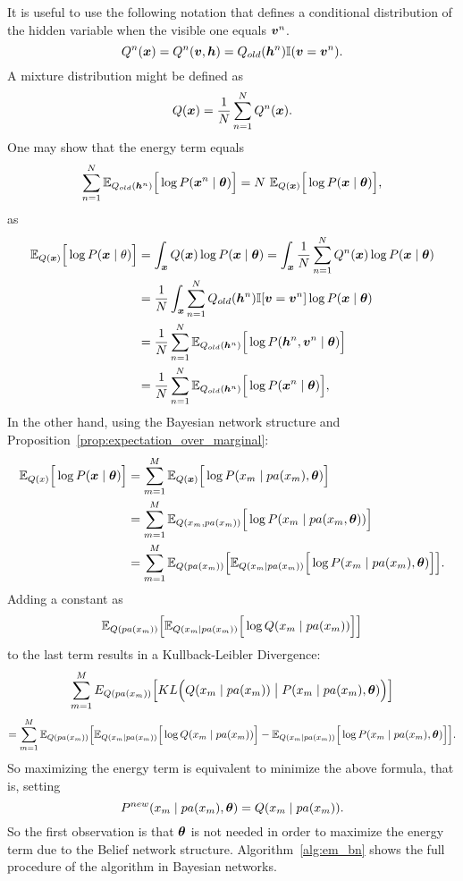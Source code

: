 It is useful to use the following notation that defines a conditional distribution of the hidden variable when the visible one equals \(\bm{v}^{n}\).
\[
  Q^{n}(\bm{x}) = Q^{n}(\bm{v},\bm{h}) = Q_{old}(\bm{h}^{n}) \mathbb{I}(\bm{v} = \bm{v}^{n}).
\]
A mixture distribution might be defined as
\[
  Q(\bm{x}) = \frac{1}{N}\sum_{n = 1}^{N}Q^{n}(\bm{x}).
\]
One may show that the energy term equals
\[
  \sum_{n = 1}^{N}\E{Q_{old}(\bh^n)}{\log{P(\bx^{n} \mid \btheta)}} = N \ \E{Q(\bx)}{\log{P(\bx \mid \btheta)}},
\]
as
\[
  \begin{aligned}
    \mathbb{E}_{Q(\bm{x})}\Big[\log{P(\bm{x}\mid \theta)}\Big] &= \int_{\bm{x}}Q(\bm{x})\log{P(\bm{x}\mid \bm{\theta})} =  \int_{\bm{x}} \frac{1}{N}\sum_{n=1}^{N}Q^{n}(\bm{x})\log{P(\bm{x}\mid \bm{\theta})} \\
    &= \frac{1}{N} \int_{\bm{x}}\sum_{n=1}^{N}Q_{old}(\bm{h}^n)\mathbb{I}[\bm{v} = \bm{v}^{n}]\log{P(\bm{x}\mid \bm{\theta})}\\
    &= \frac{1}{N}\sum_{n = 1}^{N}\mathbb{E}_{Q_{old}(\bm{h}^n)}\Big[\log{P(\bm{h}^n, \bm{v}^{n} \mid \bm{\theta})}\Big]\\
    &= \frac{1}{N}\sum_{n = 1}^{N}\mathbb{E}_{Q_{old}(\bm{h}^n)}\Big[\log{P(\bm{x}^{n} \mid \bm{\theta})}\Big],
  \end{aligned}
\]
In the other hand, using the Bayesian network structure and Proposition~\ref{prop:expectation_over_marginal}:
\[
  \begin{aligned}
    \mathbb{E}_{Q(x)}\Big[\log{P(\bm{x}\mid \bm{\theta})}\Big] &= \sum_{m = 1}^{M}\mathbb{E}_{Q(\bm{x})}\Big[\log{P(x_{m} \mid pa(x_{m}), \bm{\theta})}\Big]\\
    &= \sum_{m = 1}^{M}\mathbb{E}_{Q(x_{m}, pa(x_{m}))}\Big[\log{P(x_{m} \mid pa(x_{m}, \bm{\theta}))}\Big]\\
    &= \sum_{m = 1}^{M}\mathbb{E}_{Q(pa(x_{m}))}\Big[ \mathbb{E}_{Q(x_{m}\mid pa(x_{m}))}\Big[ \log{P(x_{m} \mid pa(x_{m}), \bm{\theta})}\Big]\Big].
\end{aligned}
\]
Adding a constant as
\[
  \mathbb{E}_{Q(pa(x_{m}))}\Big[\mathbb{E}_{Q(x_{m}\mid pa(x_{m}))}\Big[\log{Q(x_{m} \mid pa(x_{m}))}\Big]\Big]
\]
to the last term results in a Kullback-Leibler Divergence:
\[
  \sum_{m = 1}^{M} E_{Q(pa(x_{m}))} \Big[ KL\Big(Q(x_{m}\mid pa(x_{m})) \bigm| P(x_{m} \mid pa(x_{m}), \bm{\theta})\Big)\Big]
\]
\[
  =\sum_{m = 1}^{M}\mathbb{E}_{Q(pa(x_{m}))}\Big[\mathbb{E}_{Q(x_{m}\mid pa(x_{m}))}\Big[\log{Q(x_{m} \mid pa(x_{m}))}\Big] - \mathbb{E}_{Q(x_{m}\mid pa(x_{m}))}\Big[\log{P(x_{m} \mid pa(x_{m}), \bm{\theta})}\Big]\Big].
\]
So maximizing the energy term is equivalent to minimize the above formula, that is, setting
\[
  P^{new}(x_{m} \mid pa(x_{m}), \bm{\theta}) = Q(x_{m} \mid pa(x_{m})).
\]
So the first observation is that \(\bm{\theta}\) is not needed in order to maximize the energy term due to the Belief network structure. Algorithm~\ref{alg:em_bn} shows the full procedure of the algorithm in Bayesian networks.


